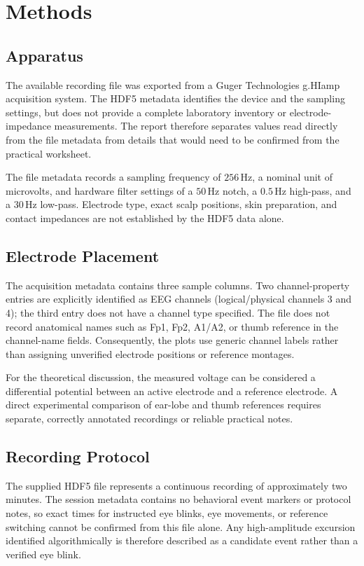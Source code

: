 \documentclass[12pt,a4paper]{article}
\begin{document}
\section{Methods}

\subsection{Apparatus}
The available recording file was exported from a Guger Technologies g.HIamp acquisition system. The HDF5 metadata identifies the device and the sampling settings, but does not provide a complete laboratory inventory or electrode-impedance measurements. The report therefore separates values read directly from the file metadata from details that would need to be confirmed from the practical worksheet.

The file metadata records a sampling frequency of $256\,\mathrm{Hz}$, a nominal unit of microvolts, and hardware filter settings of a $50\,\mathrm{Hz}$ notch, a $0.5\,\mathrm{Hz}$ high-pass, and a $30\,\mathrm{Hz}$ low-pass. Electrode type, exact scalp positions, skin preparation, and contact impedances are not established by the HDF5 data alone.

\subsection{Electrode Placement}
The acquisition metadata contains three sample columns. Two channel-property entries are explicitly identified as EEG channels (logical/physical channels 3 and 4); the third entry does not have a channel type specified. The file does not record anatomical names such as Fp1, Fp2, A1/A2, or thumb reference in the channel-name fields. Consequently, the plots use generic channel labels rather than assigning unverified electrode positions or reference montages.

For the theoretical discussion, the measured voltage can be considered a differential potential between an active electrode and a reference electrode. A direct experimental comparison of ear-lobe and thumb references requires separate, correctly annotated recordings or reliable practical notes.

\subsection{Recording Protocol}
The supplied HDF5 file represents a continuous recording of approximately two minutes. The session metadata contains no behavioral event markers or protocol notes, so exact times for instructed eye blinks, eye movements, or reference switching cannot be confirmed from this file alone. Any high-amplitude excursion identified algorithmically is therefore described as a candidate event rather than a verified eye blink.
\end{document}
